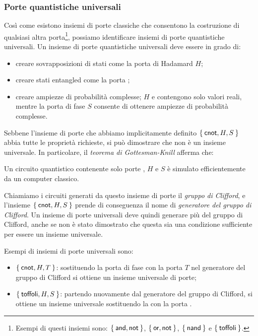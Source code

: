 \subsubsection*{Porte quantistiche universali}
\label{sec:q_gate_univ}
Così come esistono insiemi di porte classiche che consentono la costruzione di qualsiasi altra porta\footnote{Esempi di questi insiemi sono: $\Set{\text{\textsf{and}}, \text{\textsf{not}}}$, $\Set{\text{\textsf{or}}, \text{\textsf{not}}}$, $\Set{\text{\textsf{nand}}}$ e $\Set{\text{\textsf{toffoli}}}$.}, possiamo identificare insiemi di porte quantistiche universali. Un insieme di porte quantistiche universali deve essere in grado di:
\begin{itemize}
	\item creare sovrapposizioni di stati come la porta di Hadamard $H$;
	\item creare stati entangled come la porta ;
	\item creare ampiezze di probabilità complesse; $H$ e  contengono solo valori reali, mentre la porta di fase $S$ consente di ottenere ampiezze di probabilità complesse.
\end{itemize}
Sebbene l'insieme di porte che abbiamo implicitamente definito $\Set{\text{\textsf{cnot}}, H, S}$ abbia tutte le proprietà richieste, si può dimostrare che non è un insieme universale. In particolare, il \emph{teorema di Gottesman-Knill} afferma che:
\begin{theorem}
	Un circuito quantistico contenente solo porte , $H$ e $S$ è simulato efficientemente da un computer classico.
\end{theorem}
Chiamiamo i circuiti generati da questo insieme di porte il \emph{gruppo di Clifford}, e l'insieme $\Set{ \text{\textsf{cnot}}, H, S}$ prende di conseguenza il nome di \emph{generatore del gruppo di Clifford}. Un insieme di porte universali deve quindi generare più del gruppo di Clifford, anche se non è stato dimostrato che questa sia una condizione sufficiente per essere un insieme universale.

Esempi di insiemi di porte universali sono: 
\begin{itemize}
	\item $\Set{ \text{\textsf{cnot}}, H, T}$: sostituendo la porta di fase con la porta $T$ nel generatore del gruppo di Clifford si ottiene un insieme universale di porte;
	\item $\Set{ \text{\textsf{toffoli}}, H, S}$: partendo nuovamente dal generatore del gruppo di Clifford, si ottiene un insieme universale sostituendo la  con la porta .
\end{itemize}

